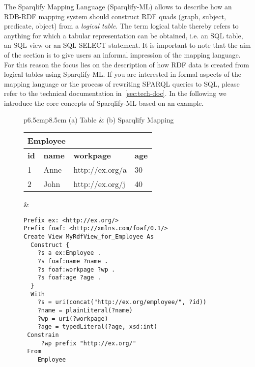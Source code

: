 \documentclass[a4paper,twoside,bibtotoc,abstracton,12pt,BCOR=15mm]{scrreprt}
\begin{document}
The Sparqlify Mapping Language (Sparqlify-ML) allows to describe how an RDB-RDF mapping system should construct RDF
quads (graph, subject, predicate, object) from a \emph{logical table}. 
The term logical table thereby refers to anything for which a tabular representation can be obtained, i.e. an SQL table, an SQL view or an SQL SELECT statement.
It is important to note that the aim of the section is to give users an informal impression of the mapping language.
For this reason the focus lies on the description of how RDF data is created from logical tables using Sparqlify-ML.
If you are interested in formal aspects of the mapping language or the process of rewriting SPARQL queries to SQL, please refer to
the technical documentation in~\autoref{sec:tech-doc}.
In the following we introduce the core concepts of Sparqlify-ML based on an example.
\begin{figure}[!p] %
\centering
\begin{tabular}{p{6.5cm}p{8.5cm}}
\toprule
(a) Table & (b) Sparqlify Mapping \\ 
\midrule

\begin{tabular}{|l|l|l|l|} \cline{1-2}
\multicolumn{2}{|c|}{Employee} \\ \hline
\textbf{id} & \textbf{name} & \textbf{workpage} & \textbf{age} \\ \hline
1 & Anne & http://ex.org/a  & 30 \\ \hline
2 & John & http://ex.org/j  & 40 \\ \hline
\end{tabular}

&

\begin{minipage}{8.5cm}
\begin{scriptsize}
\begin{verbatim}
Prefix ex: <http://ex.org/>
Prefix foaf: <http://xmlns.com/foaf/0.1/>
Create View MyRdfView_for_Employee As
  Construct {
    ?s a ex:Employee .
    ?s foaf:name ?name .
    ?s foaf:workpage ?wp .
    ?s foaf:age ?age .
  }
  With
    ?s = uri(concat("http://ex.org/employee/", ?id))
    ?name = plainLiteral(?name)
    ?wp = uri(?workpage)
    ?age = typedLiteral(?age, xsd:int)
 Constrain
     ?wp prefix "http://ex.org/"
 From
    Employee
\end{verbatim}
\end{scriptsize}
\end{minipage}



\end{tabular}
\end{figure}
\end{document}
